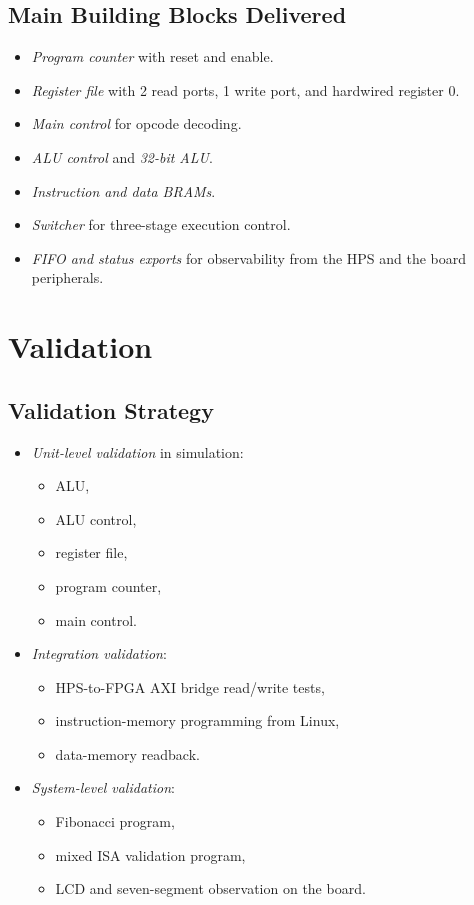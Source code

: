 \documentclass[11pt]{article}
\begin{document}
\subsection*{Main Building Blocks Delivered}
\label{sec:orgaf89ca0}
\begin{itemize}
\item \emph{Program counter} with reset and enable.
\item \emph{Register file} with 2 read ports, 1 write port, and hardwired register 0.
\item \emph{Main control} for opcode decoding.
\item \emph{ALU control} and \emph{32-bit ALU}.
\item \emph{Instruction and data BRAMs}.
\item \emph{Switcher} for three-stage execution control.
\item \emph{FIFO and status exports} for observability from the HPS and the board peripherals.
\end{itemize}
\section*{Validation}
\label{sec:org0619a93}
\subsection*{Validation Strategy}
\label{sec:orgf2653b5}
\begin{itemize}
\item \emph{Unit-level validation} in simulation:
\begin{itemize}
\item ALU,
\item ALU control,
\item register file,
\item program counter,
\item main control.
\end{itemize}
\item \emph{Integration validation}:
\begin{itemize}
\item HPS-to-FPGA AXI bridge read/write tests,
\item instruction-memory programming from Linux,
\item data-memory readback.
\end{itemize}
\item \emph{System-level validation}:
\begin{itemize}
\item Fibonacci program,
\item mixed ISA validation program,
\item LCD and seven-segment observation on the board.
\end{itemize}
\end{itemize}
\end{document}

